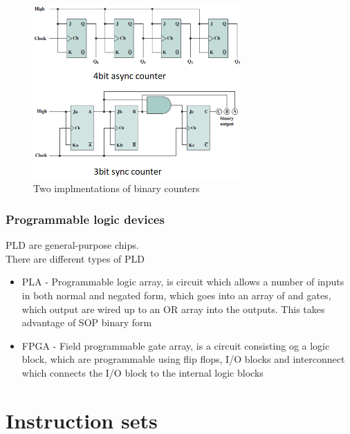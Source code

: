 \documentclass[12pt, a4paper]{article}
\begin{document}
					\begin{figure}[h!]
						\includegraphics[width=300px]{assets/counters.png}
						\centering
						\caption{Two implmentations of binary counters}
					\end{figure}
				\subsubsection{Programmable logic devices}
					PLD are general-purpose chips.\\
					There are different types of PLD
					\begin{itemize}
						\item PLA - Programmable logic array, is circuit which allows a number of inputs in both normal and negated form, which goes into an array of and gates, which output are wired up to an OR array into the outputs. This takes advantage of SOP binary form
						\item FPGA - Field programmable gate array, is a circuit consisting og a logic block, which are programmable using flip flops, I/O blocks and interconnect which connects the I/O block to the internal logic blocks
					\end{itemize}
	\section{Instruction sets}
\end{document}
